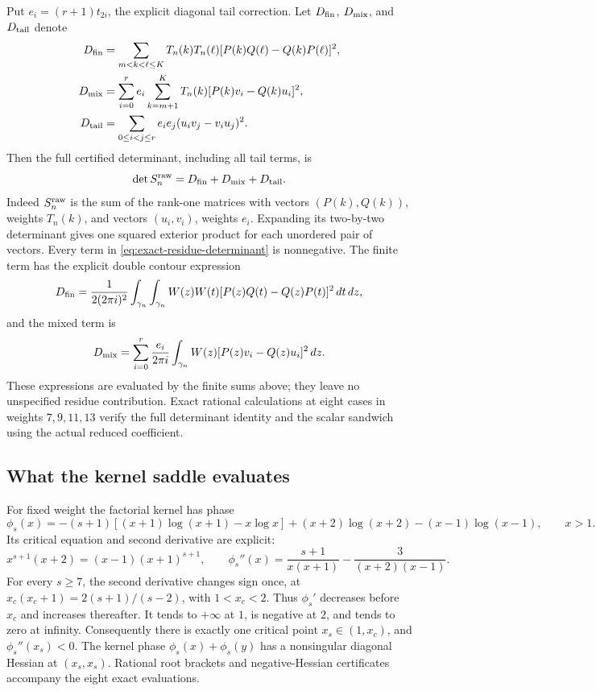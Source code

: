 \documentclass[11pt]{article}
\theoremstyle{remark}
\begin{document}
Put \(e_i=(r+1)t_{2i}\), the explicit diagonal tail correction.
Let \(D_{\rm fin}\), \(D_{\rm mix}\), and \(D_{\rm tail}\) denote
\begin{align*}
 D_{\rm fin}
 &=\sum_{m<k<\ell\le K}T_n(k)T_n(\ell)
      [P(k)Q(\ell)-Q(k)P(\ell)]^2,\\
 D_{\rm mix}
 &=\sum_{i=0}^r e_i\sum_{k=m+1}^K T_n(k)
      [P(k)v_i-Q(k)u_i]^2,\\
 D_{\rm tail}
 &=\sum_{0\le i<j\le r}e_i e_j(u_i v_j-v_i u_j)^2.
\end{align*}
Then the full certified determinant, including all tail terms, is
\begin{equation}
 \det S_n^{\rm raw}=D_{\rm fin}+D_{\rm mix}+D_{\rm tail}.
 \label{eq:exact-residue-determinant}
\end{equation}
Indeed \(S_n^{\rm raw}\) is the sum of the rank-one matrices with
vectors \((P(k),Q(k))\), weights \(T_n(k)\), and vectors
\((u_i,v_i)\), weights \(e_i\). Expanding its two-by-two determinant
gives one squared exterior product for each unordered pair of vectors.
Every term in \eqref{eq:exact-residue-determinant} is nonnegative.
The finite term has the explicit double contour expression
\[
 D_{\rm fin}=\frac1{2(2\pi i)^2}
 \int_{\gamma_n}\int_{\gamma_n}W(z)W(t)
          [P(z)Q(t)-Q(z)P(t)]^2\,dt\,dz,
\]
and the mixed term is
\[
 D_{\rm mix}=\sum_{i=0}^r\frac{e_i}{2\pi i}
       \int_{\gamma_n}W(z)[P(z)v_i-Q(z)u_i]^2\,dz.
\]
These expressions are evaluated by the finite sums above; they leave
no unspecified residue contribution. Exact rational calculations at
eight cases in weights \(7,9,11,13\) verify the full determinant
identity and the scalar sandwich using the actual reduced coefficient.

\subsection{What the kernel saddle evaluates}
For fixed weight the factorial kernel has phase
\[
 \phi_s(x)=-(s+1)[(x+1)\log(x+1)-x\log x]
       +(x+2)\log(x+2)-(x-1)\log(x-1),\qquad x>1.
\]
Its critical equation and second derivative are explicit:
\[
 x^{s+1}(x+2)=(x-1)(x+1)^{s+1},\qquad
 \phi_s''(x)=\frac{s+1}{x(x+1)}-
                       \frac3{(x+2)(x-1)}.
\]
For every \(s\ge7\), the second derivative changes sign once, at
\(x_c(x_c+1)=2(s+1)/(s-2)\), with \(1<x_c<2\).
Thus \(\phi_s'\) decreases before \(x_c\) and increases thereafter.
It tends to \(+\infty\) at \(1\), is negative at \(2\), and tends
to zero at infinity. Consequently there is exactly one critical point
\(x_s\in(1,x_c)\), and \(\phi_s''(x_s)<0\).
The kernel phase \(\phi_s(x)+\phi_s(y)\) has a nonsingular diagonal
Hessian at \((x_s,x_s)\). Rational root brackets and negative-Hessian
certificates accompany the eight exact evaluations.
\end{document}
